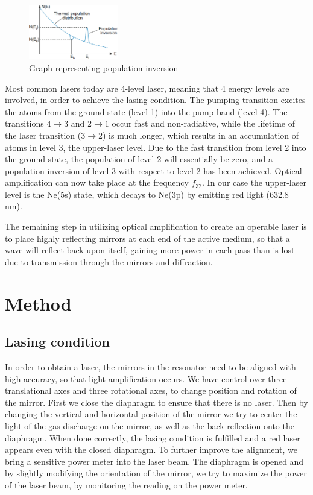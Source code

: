 \documentclass{scrartcl}
\begin{document}
\begin{figure}
    \centering
    \includegraphics[width=0.35\textwidth]{IntroBilder/populationInversion.png}
    \caption{Graph representing population inversion}
    \label{fig:popInv}
\end{figure}
Most common lasers today are 4-level laser, meaning that 4 energy levels are involved, in order to achieve the lasing condition. The pumping transition excites the atoms from the ground state (level 1) into the pump band (level 4). The transitions $4\longrightarrow3$ and $2\longrightarrow1$ occur fast and non-radiative, while the lifetime of the laser transition ($3\longrightarrow2$) is much longer, which results in an accumulation of atoms in level 3, the upper-laser level. Due to the fast transition from level 2 into the ground state, the population of level 2 will essentially be zero, and a population inversion of level 3 with respect to level 2 has been achieved. Optical amplification can now take place at the frequency $f_{32}$. In our case the upper-laser level is the Ne(5s) state, which decays to Ne(3p) by emitting red light (632.8 nm).

The remaining step in utilizing optical amplification to create an operable laser is to place highly reflecting mirrors at each end of the active medium, so that a wave will reflect back upon itself, gaining more power in each pass than is lost due to transmission through the mirrors and diffraction. \cite{HeNeLaser}\cite{popInv}\cite{Einstein}
\section{Method}

\subsection{Lasing condition}
In order to obtain a laser, the mirrors in the resonator need to be aligned with high accuracy, so that light amplification occurs. We have control over three translational axes and three rotational axes, to change position and rotation of the mirror.
First we close the diaphragm to ensure that there is no laser. Then by changing the vertical and horizontal position of the mirror we try to center the light of the gas discharge on the mirror, as well as the back-reflection onto the diaphragm. When done correctly, the lasing condition is fulfilled and a red laser appears even with the closed diaphragm.
To further improve the alignment, we bring a sensitive power meter into the laser beam. The diaphragm is opened and by slightly modifying the orientation of the mirror, we try to maximize the power of the laser beam, by monitoring the reading on the power meter.
\end{document}
